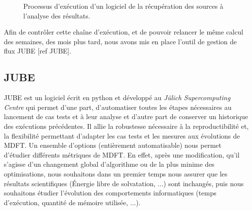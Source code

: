 \begin{figure}[H]
  \center
  \caption{Processus d'exécution d'un logiciel de la récupération des sources à l'analyse des résultats.}
  \label{fig:JUBE_process}
\end{figure}

Afin de contrôler cette chaîne d’exécution, et de pouvoir relancer le même calcul des semaines, des mois plus tard, nous avons mis en place l’outil de gestion de flux JUBE [ref JUBE].

\subsection{JUBE}
JUBE est un logiciel écrit en python et développé au \textit{Jülich Supercomputing Centre} qui permet d'une part, d'automatiser toutes les étapes nécessaires au lancement de cas tests et à leur analyse et d'autre part de conserver un historique des exécutions précédentes. Il allie la robustesse nécessaire à la reproductibilité et, la flexibilité permettant d'adapter les cas tests et les mesures aux évolutions de MDFT. Un ensemble d'options (entièrement automatisable) nous permet d'étudier différents métriques de MDFT. En effet, après une modification, qu'il s'agisse d'un changement global d'algorithme ou de la plus minime des optimisations, nous souhaitons dans un premier temps nous assurer que les résultats scientifiques (\'Energie libre de solvatation, ...) sont inchangés, puis nous souhaitons étudier l'évolution des comportements informatiques (temps d'exécution, quantité de mémoire utilisée, ...).

